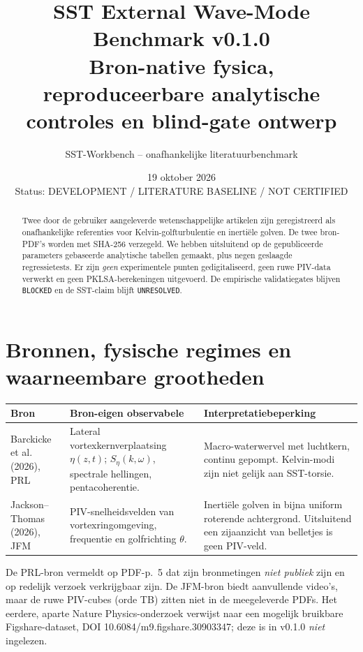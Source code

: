 \documentclass[10pt,a4paper]{article}
\title{\textbf{SST External Wave-Mode Benchmark v0.1.0}\\\large Bron-native fysica, reproduceerbare analytische controles en blind-gate ontwerp}
\author{SST-Workbench -- onafhankelijke literatuurbenchmark}
\date{19 oktober 2026\\\small Status: DEVELOPMENT / LITERATURE BASELINE / NOT CERTIFIED}
\begin{document}
\maketitle
\begin{abstract}
Twee door de gebruiker aangeleverde wetenschappelijke artikelen zijn geregistreerd als onafhankelijke referenties voor Kelvin-golfturbulentie en inertiële golven. De twee bron-PDF's worden met SHA-256 verzegeld. We hebben uitsluitend op de gepubliceerde parameters gebaseerde analytische tabellen gemaakt, plus negen geslaagde regressietests. Er zijn \emph{geen} experimentele punten gedigitaliseerd, geen ruwe PIV-data verwerkt en geen PKLSA-berekeningen uitgevoerd. De empirische validatiegates blijven \texttt{BLOCKED} en de SST-claim blijft \texttt{UNRESOLVED}.
\end{abstract}

\section{Bronnen, fysische regimes en waarneembare grootheden}
\begin{tabular}{p{.26\linewidth}p{.32\linewidth}p{.33\linewidth}}
\toprule
Bron & Bron-eigen observabele & Interpretatiebeperking\\ \midrule
Barckicke et al. (2026), PRL \cite{Barckicke2026PRL} & Lateral vortexkernverplaatsing $\eta(z,t)$; $S_\eta(k,\omega)$, spectrale hellingen, pentacoherentie. & Macro-waterwervel met luchtkern, continu gepompt. Kelvin-modi zijn niet gelijk aan SST-torsie.\\
Jackson--Thomas (2026), JFM \cite{JacksonThomas2026} & PIV-snelheidsvelden van vortexringomgeving, frequentie en golfrichting $\theta$. & Inertiële golven in bijna uniform roterende achtergrond. Uitsluitend een zijaanzicht van belletjes is geen PIV-veld.\\
\bottomrule
\end{tabular}

De PRL-bron vermeldt op PDF-p.~5 dat zijn bronmetingen \emph{niet publiek} zijn en op redelijk verzoek verkrijgbaar zijn. De JFM-bron biedt aanvullende video's, maar de ruwe PIV-cubes (orde TB) zitten niet in de meegeleverde PDFs. Het eerdere, aparte Nature Physics-onderzoek \cite{Barckicke2026Nature} verwijst naar een mogelijk bruikbare Figshare-dataset, DOI 10.6084/m9.figshare.30903347; deze is in v0.1.0 \emph{niet} ingelezen.
\end{document}

